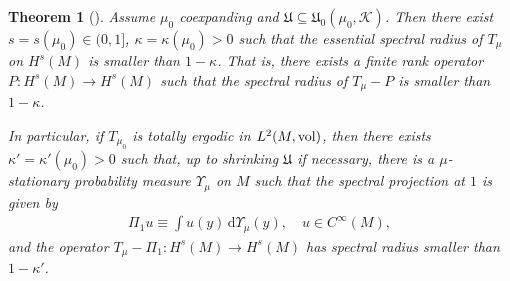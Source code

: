 \documentclass[11pt, leqno, fleqn]{amsart}
\def\cU{\mathfrak U}
\newcommand{\margem}[1]{\marginpar{{\scriptsize {#1}}}}
\def\clr{   \color{red}}
\def\clblue{   \color{blue}}
\def\clo{   \color{orange}}
\def\clb{   \color{black}}
\newcommand{\dd}{\,\mathrm{d}}
\newcommand{\cP}{{\mathcal P}}
\newcommand{\cK}{{\mathcal K}}
\newcommand{\aryst}{\begin{eqnarray*}}
\newcommand{\earyst}{\end{eqnarray*}}
\newtheorem{thm}{\bf Theorem}[section]
\theoremstyle{definition}
\theoremstyle{definition}
\def \vol{  {\rm vol} }
\newcommand{\Diff}{{\rm Diff}}
\begin{document}
		   
		 \begin{thm}[\cite{DD, T3}] \label{Thm Spectralgap} 
		 	    Assume  $\mu_{0}$ coexpanding and   $\cU\subseteq \cU_{0}(\mu_{0},\cK)$. 
		 	Then there exist $s = s(\mu_0)  \in  (0, 1]$, $\kappa = \kappa( \mu_0) > 0$  such that the essential spectral radius of $T_{\mu}$ on $H^s(M)$ is smaller than $1 - \kappa$. That is, there exists a finite rank operator $P : H^s(M) \to H^s(M)$ such that the spectral radius of $T_{\mu} - P$ is  smaller than $1 - \kappa$.
			
		 			 	
		 	In particular, if $T_{\mu_0}$ is totally ergodic in $L^2(M, \vol)$,  
		 	then there exists $\kappa' = \kappa'(\mu_0) > 0$ such that, up to shrinking $\cU$ if necessary, there is a  $\mu$-stationary probability measure $\Upsilon_\mu$ on $M$ such that the spectral projection at $1$ is given by  
			\aryst 
		 	\Pi_1 u \equiv \int u(y) \dd\Upsilon_{\mu}(y), \quad u \in C^{\infty}(M),
		 	\earyst 
			 and the operator $T_{\mu} - \Pi_1 : H^s(M) \to H^s(M)$ has spectral radius  smaller than $1 - \kappa'$.  %
		 \end{thm}
		 
%		 
%		 
%		 
%		 
%		 
		 
\end{document}

